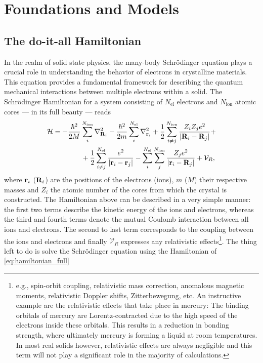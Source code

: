 \documentclass[../../main.tex]{subfiles}
\begin{document}
\chapter{Foundations and Models}

\section{The do-it-all Hamiltonian}

In the realm of solid state physics, the many-body Schrödinger equation plays a crucial role in understanding the behavior of electrons in crystalline materials. This equation provides a fundamental framework for describing the quantum mechanical interactions between multiple electrons within a solid. The Schrödinger Hamiltonian for a system consisting of $N_{\text{el}}$ electrons and $N_{\text{ion}}$ atomic cores --- in its full beauty --- reads
\begin{align}\label{eq:hamiltonian_full}
\begin{split}
        \mathcal{H}&=-\frac{\hbar^2}{2M}\sum_{i}^{N_{\text{ion}}}\nabla^2_{\textbf{R}_i}-\frac{\hbar^2}{2m}\sum_{i}^{N_{\text{el}}}\nabla^2_{\textbf{r}_i}+\frac{1}{2}\sum_{i\neq j}^{N_{\text{ion}}}\frac{Z_i Z_j e^2}{|\textbf{R}_i-\textbf{R}_j|}+\\
        &\qquad\qquad+\frac{1}{2}\sum_{i\neq j}^{N_{\text{el}}}\frac{e^2}{|\textbf{r}_i-\textbf{r}_j|}-\sum_i^{N_{\text{el}}}\sum_j^{N_{\text{ion}}}\frac{Z_j e^2}{|\textbf{r}_i-\textbf{R}_j|}+\mathcal{V}_R,  
\end{split}
\end{align}
where $\textbf{r}_i$ ($\textbf{R}_i$) are the positions of the electrons (ions), $m$ ($M$) their respective masses and $Z_i$ the atomic number of the cores from which the crystal is constructed. The Hamiltonian above can be described in a very simple manner: the first two terms describe the kinetic energy of the ions and electrons, whereas the third and fourth terms denote the mutual Coulomb interaction between all ions and electrons. The second to last term corresponds to the coupling between the ions and electrons and finally $\mathcal{V}_R$ expresses any relativistic effects\footnote{e.g., spin-orbit coupling, relativistic mass correction, anomalous magnetic moments, relativistic Doppler shifts, Zitterbewegung, etc. An instructive example are the relativistic effects that take place in mercury: The binding orbitals of mercury are Lorentz-contracted due to the high speed of the electrons inside these orbitals. This results in a reduction in bonding strength, where ultimately mercury is forming a liquid at room temperatures. In most real solids however, relativistic effects are always negligible and this term will not play a significant role in the majority of calculations.}. The  thing left to do is solve the Schrödinger equation using the Hamiltonian of \eqref{eq:hamiltonian_full}
\end{document}
